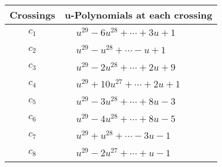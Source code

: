 \documentclass[1p]{elsarticle_modified}
\theoremstyle{definition}
\begin{document}
\begin{tabular}{m{50pt}|m{274pt}}
Crossings & \hspace{64pt}u-Polynomials at each crossing \\
\hline $$\begin{aligned}c_{1}\end{aligned}$$&$\begin{aligned}
&u^{29}-6 u^{28}+\cdots+3 u+1
\end{aligned}$\\
\hline $$\begin{aligned}c_{2}\end{aligned}$$&$\begin{aligned}
&u^{29}- u^{28}+\cdots- u+1
\end{aligned}$\\
\hline $$\begin{aligned}c_{3}\end{aligned}$$&$\begin{aligned}
&u^{29}-2 u^{28}+\cdots+2 u+9
\end{aligned}$\\
\hline $$\begin{aligned}c_{4}\end{aligned}$$&$\begin{aligned}
&u^{29}+10 u^{27}+\cdots+2 u+1
\end{aligned}$\\
\hline $$\begin{aligned}c_{5}\end{aligned}$$&$\begin{aligned}
&u^{29}-3 u^{28}+\cdots+8 u-3
\end{aligned}$\\
\hline $$\begin{aligned}c_{6}\end{aligned}$$&$\begin{aligned}
&u^{29}-4 u^{28}+\cdots+8 u-5
\end{aligned}$\\
\hline $$\begin{aligned}c_{7}\end{aligned}$$&$\begin{aligned}
&u^{29}+u^{28}+\cdots-3 u-1
\end{aligned}$\\
\hline $$\begin{aligned}c_{8}\end{aligned}$$&$\begin{aligned}
&u^{29}-2 u^{27}+\cdots+u-1
\end{aligned}$\\

\end{tabular}
\end{document}
